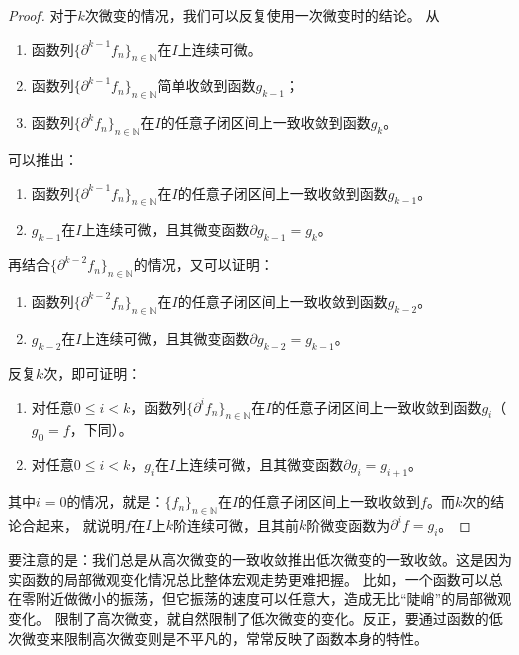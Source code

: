 \documentclass[12pt,UTF8]{ctexbook}
\begin{document}
\begin{appendix}
\begin{proof}
    对于$k$次微变的情况，我们可以反复使用一次微变时的结论。
    从
    \begin{enumerate}
        \item 函数列$\{\partial^{k-1} f_n\}_{n\in\mathbb{N}}$在$I$上连续可微。
        \item 函数列$\{\partial^{k-1} f_n\}_{n\in\mathbb{N}}$简单收敛到函数$g_{k-1}$；
        \item 函数列$\{\partial^k f_n\}_{n\in\mathbb{N}}$在$I$的任意子闭区间上一致收敛到函数$g_k$。
    \end{enumerate}
    可以推出：
    \begin{enumerate}
        \item 函数列$\{\partial^{k-1} f_n\}_{n\in\mathbb{N}}$在$I$的任意子闭区间上一致收敛到函数$g_{k-1}$。
        \item $g_{k-1}$在$I$上连续可微，且其微变函数$\partial g_{k-1} = g_k$。
    \end{enumerate}
    再结合$\{\partial^{k-2} f_n\}_{n\in\mathbb{N}}$的情况，又可以证明：
    \begin{enumerate}
        \item 函数列$\{\partial^{k-2} f_n\}_{n\in\mathbb{N}}$在$I$的任意子闭区间上一致收敛到函数$g_{k-2}$。
        \item $g_{k-2}$在$I$上连续可微，且其微变函数$\partial g_{k-2} = g_{k-1}$。
    \end{enumerate}
    反复$k$次，即可证明：
    \begin{enumerate}
        \item 对任意$0\leqslant i < k$，函数列$\{\partial^{i} f_n\}_{n\in\mathbb{N}}$在$I$的任意子闭区间上一致收敛到函数$g_{i}$（$g_0 = f$，下同）。
        \item 对任意$0\leqslant i < k$，$g_{i}$在$I$上连续可微，且其微变函数$\partial g_{i} = g_{i+1}$。
    \end{enumerate}
    其中$i = 0$的情况，就是：$\{f_n\}_{n\in\mathbb{N}}$在$I$的任意子闭区间上一致收敛到$f$。而$k$次的结论合起来，
    就说明$f$在$I$上$k$阶连续可微，且其前$k$阶微变函数为$\partial^i f = g_i$。

\end{proof}

要注意的是：我们总是从高次微变的一致收敛推出低次微变的一致收敛。这是因为实函数的局部微观变化情况总比整体宏观走势更难把握。
比如，一个函数可以总在零附近做微小的振荡，但它振荡的速度可以任意大，造成无比“陡峭”的局部微观变化。
限制了高次微变，就自然限制了低次微变的变化。反正，要通过函数的低次微变来限制高次微变则是不平凡的，常常反映了函数本身的特性。


\end{appendix}
\end{document}
